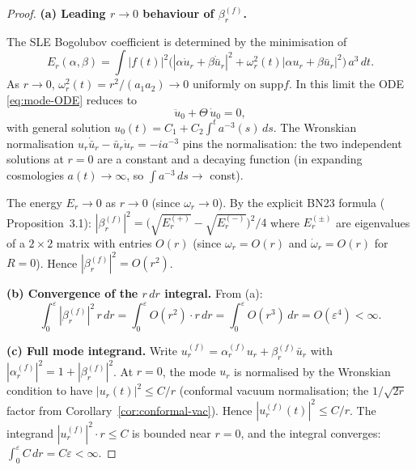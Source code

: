 \documentclass[12pt, a4paper]{article}
\theoremstyle{remark}
\newcommand{\supp}{\mathrm{supp}}
\begin{document}
\begin{proof}
  \textbf{(a) Leading $r \to 0$ behaviour of $\beta_r^{(f)}$.}

  The SLE Bogolubov coefficient is determined by the minimisation of
  \begin{equation}
    E_r(\alpha,\beta) = \int |f(t)|^2
      \bigl(|\alpha\dot{u}_r+\beta\dot{\bar{u}}_r|^2
        + \omega_r^2(t)|\alpha u_r+\beta\bar{u}_r|^2\bigr)\,a^3\,dt.
  \end{equation}
  As $r \to 0$, $\omega_r^2(t) = r^2/(a_1 a_2) \to 0$ uniformly on
  $\supp f$.  In this limit the ODE \eqref{eq:mode-ODE} reduces to
  \begin{equation}
    \ddot{u}_0 + \Theta\,\dot{u}_0 = 0,
  \end{equation}
  with general solution $u_0(t) = C_1 + C_2 \int^t a^{-3}(s)\,ds$.
  The Wronskian normalisation $u_r\dot{\bar{u}}_r - \bar{u}_r\dot{u}_r = -i a^{-3}$
  pins the normalisation: the two independent solutions at $r = 0$ are
  a constant and a decaying function (in expanding cosmologies
  $a(t) \to \infty$, so $\int a^{-3}\,ds \to$ const).

  The energy $E_r \to 0$ as $r \to 0$ (since $\omega_r \to 0$).
  By the explicit BN23 formula (\cite{BN23} Proposition~3.1):
  $|\beta_r^{(f)}|^2 = \bigl(\sqrt{E_r^{(+)}} - \sqrt{E_r^{(-)}}\bigr)^2 / 4$
  where $E_r^{(\pm)}$ are eigenvalues of a $2\times 2$ matrix with entries
  $O(r)$ (since $\omega_r = O(r)$ and $\dot\omega_r = O(r)$ for $R=0$).
  Hence $|\beta_r^{(f)}|^2 = O(r^2)$.

  \textbf{(b) Convergence of the $r\,dr$ integral.}
  From (a):
  \begin{equation}
    \int_0^\varepsilon |\beta_r^{(f)}|^2\,r\,dr
    = \int_0^\varepsilon O(r^2) \cdot r\,dr
    = \int_0^\varepsilon O(r^3)\,dr
    = O(\varepsilon^4) < \infty.
  \end{equation}

  \textbf{(c) Full mode integrand.}
  Write $u_r^{(f)} = \alpha_r^{(f)} u_r + \beta_r^{(f)}\bar{u}_r$ with
  $|\alpha_r^{(f)}|^2 = 1 + |\beta_r^{(f)}|^2$.
  At $r = 0$, the mode $u_r$ is normalised by the Wronskian condition
  to have $|u_r(t)|^2 \le C/r$ (conformal vacuum normalisation;
  the $1/\sqrt{2r}$ factor from Corollary~\ref{cor:conformal-vac}).
  Hence $|u_r^{(f)}(t)|^2 \le C/r$.
  The integrand $|u_r^{(f)}|^2 \cdot r \le C$ is bounded near $r = 0$,
  and the integral converges:
  $\int_0^\varepsilon C\,dr = C\varepsilon < \infty$.
\end{proof}
\end{document}
